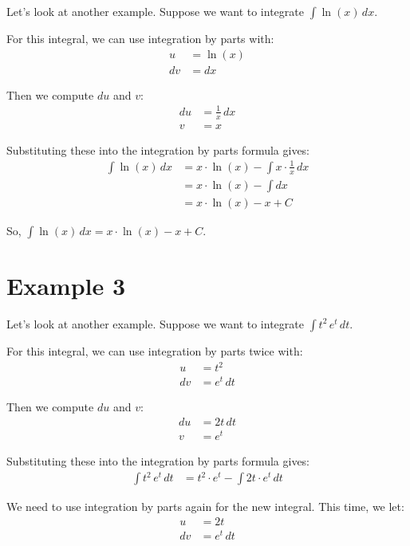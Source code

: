 \documentclass{article}
\begin{document}
Let's look at another example. Suppose we want to integrate $\int \ln(x) \, dx$.

For this integral, we can use integration by parts with:
\begin{align*}
    u &= \ln(x) \\
    dv &= dx
\end{align*}

Then we compute $du$ and $v$:
\begin{align*}
    du &= \frac{1}{x} \, dx \\
    v &= x
\end{align*}

Substituting these into the integration by parts formula gives:
\begin{align*}
    \int \ln(x) \, dx &= x \cdot \ln(x) - \int x \cdot \frac{1}{x} \, dx \\
    &= x \cdot \ln(x) - \int dx \\
    &= x \cdot \ln(x) - x + C
\end{align*}

So, $\int \ln(x) \, dx = x \cdot \ln(x) - x + C$.

\section{Example 3}

Let's look at another example. Suppose we want to integrate $\int t^2 \, e^t \, dt$.

For this integral, we can use integration by parts twice with:
\begin{align*}
    u &= t^2 \\
    dv &= e^t \, dt
\end{align*}

Then we compute $du$ and $v$:
\begin{align*}
    du &= 2t \, dt \\
    v &= e^t
\end{align*}

Substituting these into the integration by parts formula gives:
\begin{align*}
    \int t^2 \, e^t \, dt &= t^2 \cdot e^t - \int 2t \cdot e^t \, dt
\end{align*}

We need to use integration by parts again for the new integral. This time, we let:
\begin{align*}
    u &= 2t \\
    dv &= e^t \, dt
\end{align*}
\end{document}
